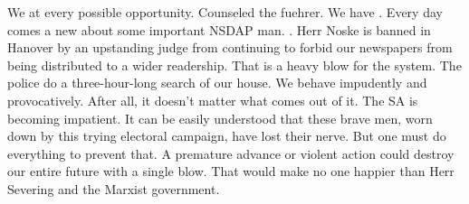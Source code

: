 We  at every possible opportunity. Counseled the fuehrer. We have . Every day comes a new  about some important NSDAP man. . Herr Noske is banned in Hanover by an upstanding judge from continuing to forbid our newspapers from being distributed to a wider readership. That is a heavy blow for the system. The police do a three-hour-long search of our house. We behave impudently and provocatively. After all, it doesn't matter what comes out of it. The SA is becoming impatient. It can be easily understood that these brave men, worn down by this trying electoral campaign, have lost their nerve. But one must do everything to prevent that. A premature advance or violent action could destroy our entire future with a single blow. That would make no one happier than Herr Severing and the Marxist government.